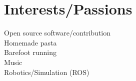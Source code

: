 \documentclass[letterpaper]{deedy-resume}
\begin{document}
\begin{minipage}[t]{0.26\textwidth}




\vspace{2em}
\section{Interests/Passions}
\vspace{1em}
\textbullet{} Open source software/contribution\\
\textbullet{} Homemade pasta\\
\textbullet{} Barefoot running\\
\textbullet{} Music\\
\textbullet{} Robotics/Simulation (ROS)\\

\end{minipage} %
\hfill
\vrule
\hspace{3ex}
%
%
\end{document}
